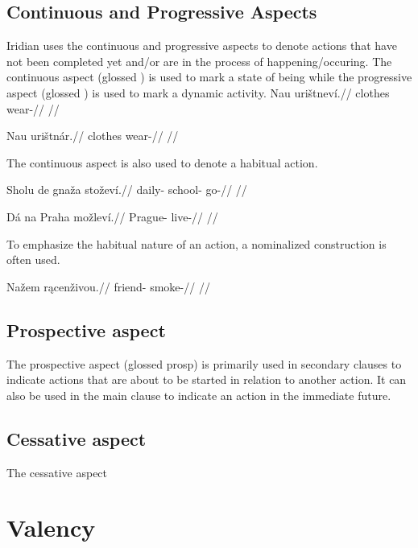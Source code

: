 \subsection{Continuous and Progressive Aspects}
Iridian uses the continuous and progressive aspects to denote actions that have not been completed yet and/or are in the process of happening/occuring. The continuous aspect (glossed ) is used to mark a state of being while the progressive aspect (glossed ) is used to mark a dynamic activity.
\pex
\begingl
\gla Nau urištneví.//
\glb clothes wear-//
\glft {} //
\endgl
\xe

\pex
\begingl
\gla Nau urištnár.//
\glb clothes wear-//
\glft {} //
\endgl
\xe

The continuous aspect is also used to denote a habitual action.

\pex
\begingl
\gla Sholu de gnaža stoževí.//
\glb daily-  school- go-//
\glft {} //
\endgl
\xe

\pex
\begingl
\gla Dá na Praha možleví.//
\glb {}  Prague- live-//
\glft {} //
\endgl
\xe

To emphasize the habitual nature of an action, a nominalized construction is often used.

\pex
\begingl
\gla Nažem r\k{a}cenživou.//
\glb friend- smoke-//
\glft {} //
\endgl
\xe

\subsection{Prospective aspect}
\par The prospective aspect (glossed {\sc prosp}) is primarily used in secondary clauses to indicate actions that are about to be started in relation to another action. It can also be used in the main clause to indicate an action in the immediate future.

\subsection{Cessative aspect}
The cessative aspect

\section{Valency}

